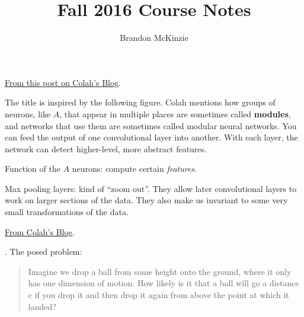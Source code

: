 \documentclass[11pt]{article}
\title{\vspace{-10mm}\fontsize{24pt}{8pt}\selectfont\textbf{Fall 2016 Course Notes}\vspace*{-4mm}}
\author{Brandon McKinzie}
\date{}
\begin{document}
\dosecttoc
\tableofcontents

\label{Blogs}




\p \href{https://colah.github.io/posts/2014-07-Conv-Nets-Modular/}{From this post on Colah's Blog}. 

\myspace The title is inspired by the following figure. Colah mentions how groups of neurons, like $A$, that appear in multiple places are sometimes called \textbf{modules}, and networks that use them are sometimes called modular neural networks. You can feed the output of one convolutional layer into another. With each layer, the network can detect higher-level, more abstract features.
\begin{compactitem}[$\longrightarrow$]
	\item Function of the $A$ neurons: compute certain \textit{features}.
	
	\item Max pooling layers: kind of ``zoom out''. They allow later convolutional layers to work on larger sections of the data. They also make us invariant to some very small transformations of the data.
\end{compactitem}





\p \href{https://colah.github.io/posts/2014-07-Understanding-Convolutions/}{From Colah's Blog}. 

\p {}. The posed problem:
\begin{footnotesize}
	\begin{quote}
		Imagine we drop a ball from some height onto the ground, where it only has one dimension of motion. How likely is it that a ball will go a distance c if you drop it and then drop it again from above the point at which it landed?
	\end{quote}
\end{footnotesize}
\end{document}
